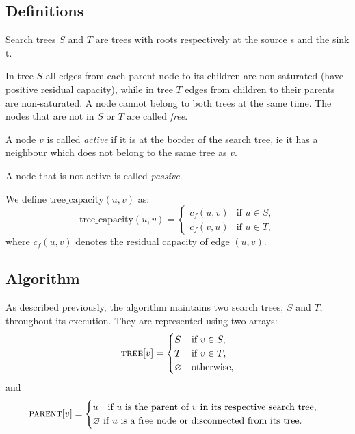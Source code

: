\subsection{Definitions}

\begin{defn}
Search trees $S$ and
$T$ are trees with roots respectively at the source s and the sink t. 

In tree $S$ all edges from each parent
node to its children are non-saturated (have positive residual capacity), while in tree $T$ edges from children to their parents are non-saturated. A node cannot belong to both trees at the same time. The nodes that are not in $S$ or $T$ are called \emph{free}.
\end{defn}

\begin{defn}
A node $v$ is called \emph{active} if it is at the border of the search tree, ie it has a neighbour which does not belong to the same tree as $v$. 

A node that is not active is called \emph{passive}.
\end{defn}

\begin{defn}
We define $\text{tree\_capacity}(u,v)$ as:
\[
\text{tree\_capacity}(u,v) = 
\begin{cases}
c_f(u,v) & \text{if } u \in S, \\
c_f(v,u) & \text{if } u \in T,
\end{cases}
\]
where $c_f(u,v)$ denotes the residual capacity of edge $(u,v)$.
\end{defn}

\subsection{Algorithm}

As described previously, the algorithm maintains two search trees, $S$ and $T$, throughout its execution.  
They are represented using two arrays:
$$
\textsc{tree}[v] = 
\begin{cases}
S & \text{if } v \in S, \\
T & \text{if } v \in T, \\
\varnothing & \text{otherwise},
\end{cases}
$$
and
$$
\textsc{parent}[v] = 
\begin{cases} 
u \quad \text{if } u \text{ is the parent of } v \text{ in its respective search tree}, \\
\varnothing \text{ if } u \text{ is a free node or disconnected from its tree}. \\
\end{cases}
$$

